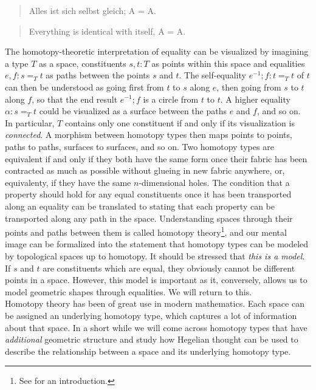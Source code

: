 \documentclass{article}
\begin{document}
\begin{quote}
    Alles ist sich selbst gleich; A = A.
\end{quote}

\begin{quote}
    Everything is identical with itself, A = A.
\end{quote}

The homotopy-theoretic interpretation of equality can be visualized by imagining a type $T$ as a space, constituents $s,t:T$ as points within this space and equalities $e,f:s=_T t$ as paths between the points $s$ and $t$. The self-equality $e^{-1};f:t=_T t$ of $t$ can then be understood as going first from $t$ to $s$ along $e$, then going from $s$ to $t$ along $f$, so that the end result $e^{-1};f$ is a circle from $t$ to $t$. A higher equality $\alpha:s=_T t$ could be visualized as a surface between the paths $e$ and $f$, and so on. In particular, $T$ contains only one constituent if and only if its visualization is \emph{connected}. A morphism between homotopy types then maps points to points, paths to paths, surfaces to surfaces, and so on. Two homotopy types are equivalent if and only if they both have the same form once their fabric has been contracted as much as possible without glueing in new fabric anywhere, or, equivalenty, if they have the same $n$-dimensional holes. The condition that a property should hold for any equal constituents once it has been transported along an equality can be translated to stating that each property can be transported along any path in the space. Understanding spaces through their points and paths between them is called homotopy theory\footnote{See \cite{Htt} for an introduction.}, and our mental image can be formalized into the statement that homotopy types can be modeled by topological spaces up to homotopy. It should be stressed that \emph{this is a model}. If $s$ and $t$ are constituents which are equal, they obviously cannot be different points in a space. However, this model is important as it, conversely, allows us to model geometric shapes through equalities. We will return to this. \\

Homotopy theory has been of great use in modern mathematics. Each space can be assigned an underlying homotopy type, which captures a lot of information about that space. In a short while we will come across homotopy types that have \emph{additional} geometric structure and study how Hegelian thought can be used to describe the relationship between a space and its underlying homotopy type. \\
\end{document}
